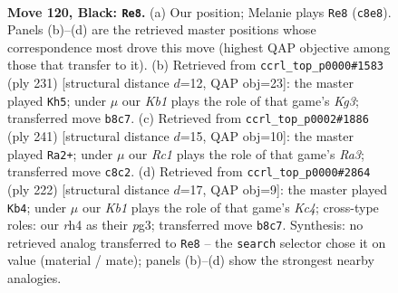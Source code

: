 \documentclass[11pt]{article}
\begin{document}
\clearpage

\begin{figure}[p]\centering
\begin{subfigure}{0.46\textwidth}\centering
\resizebox{\linewidth}{!}{%
\newchessgame
\chessboard[
  setfen={1kr5/8/3Rp3/4P3/5P1R/8/8/5K2 b - - 26 120},
  showmover=false,
  pgfstyle=straightmove, color=movearrow, markmove={c8-e8}
]}
\caption{}
\end{subfigure}\hfill
\begin{subfigure}{0.46\textwidth}\centering
\resizebox{\linewidth}{!}{%
\newchessgame
\chessboard[
  setfen={8/8/6k1/4r3/5Rp1/2K3P1/5P2/8 b - - 34 116},
  showmover=false,
  pgfstyle=straightmove, color=movearrow, markmove={g6-h5}
]}
\caption{}
\end{subfigure}
\\[4pt]
\begin{subfigure}{0.46\textwidth}\centering
\resizebox{\linewidth}{!}{%
\newchessgame
\chessboard[
  setfen={8/8/r5k1/4R1p1/6P1/5P2/5K2/8 b - - 8 121},
  showmover=false,
  pgfstyle=straightmove, color=movearrow, markmove={a6-a2}
]}
\caption{}
\end{subfigure}\hfill
\begin{subfigure}{0.46\textwidth}\centering
\resizebox{\linewidth}{!}{%
\newchessgame
\chessboard[
  setfen={1r6/8/8/1P4k1/p1KR4/P5p1/8/8 w - - 0 112},
  showmover=false,
  pgfstyle=straightmove, color=movearrow, markmove={c4-b4}
]}
\caption{}
\end{subfigure}
\caption{\textbf{Move 120, Black: \texttt{Re8}.} (a) Our position; Melanie plays \texttt{Re8} (\texttt{c8e8}). Panels (b)--(d) are the retrieved master positions whose correspondence most drove this move (highest QAP objective among those that transfer to it). (b) Retrieved from \texttt{ccrl\_top\_p0000\#1583} (ply 231) [structural distance $d$=12, QAP obj=23]: the master played \texttt{Kh5}; under $\mu$ our \emph{Kb1} plays the role of that game's \emph{Kg3}; transferred move \texttt{b8c7}. (c) Retrieved from \texttt{ccrl\_top\_p0002\#1886} (ply 241) [structural distance $d$=15, QAP obj=10]: the master played \texttt{Ra2+}; under $\mu$ our \emph{Rc1} plays the role of that game's \emph{Ra3}; transferred move \texttt{c8c2}. (d) Retrieved from \texttt{ccrl\_top\_p0000\#2864} (ply 222) [structural distance $d$=17, QAP obj=9]: the master played \texttt{Kb4}; under $\mu$ our \emph{Kb1} plays the role of that game's \emph{Kc4}; cross-type roles: our \emph{r}h4 as their \emph{p}g3; transferred move \texttt{b8c7}. Synthesis: no retrieved analog transferred to \texttt{Re8} -- the \texttt{search} selector chose it on value (material / mate); panels (b)--(d) show the strongest nearby analogies.}
\label{fig:thought-m239}
\end{figure}
\end{document}

